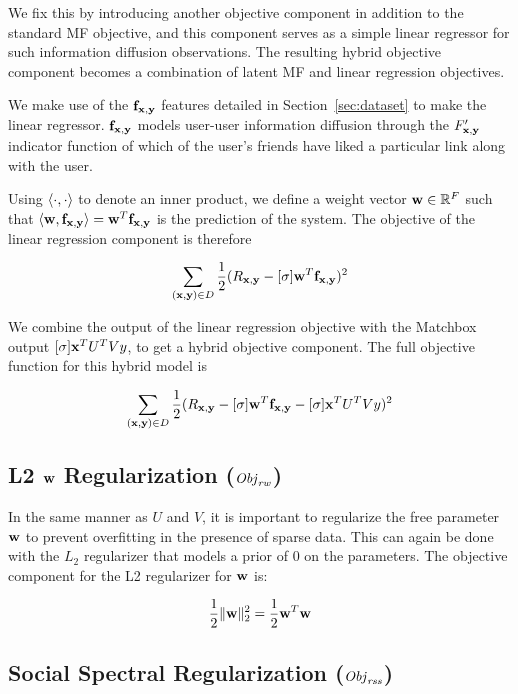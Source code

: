 We fix this by introducing another objective component in addition to the standard MF objective, and this component serves as a simple linear regressor for such information diffusion observations. The resulting hybrid objective component becomes a combination of latent MF and linear regression objectives.

We make use of the $\mathbf{f}_{\mathbf{x},\mathbf{y}}$ features detailed in Section~\ref{sec:dataset} to make the linear regressor. $\mathbf{f}_{\mathbf{x},\mathbf{y}}$ models user-user information diffusion through the $F'_{\mathbf{x},\mathbf{y}}$ indicator function of which of the user's friends have liked a particular link along with the user.

Using $\langle \cdot,\cdot \rangle$ to denote an inner product, we define a weight
vector $\mathbf{w} \in \mathbb{R}^F$ such that $\langle \mathbf{w}, \mathbf{f}_{\mathbf{x},\mathbf{y}} \rangle = \mathbf{w}^T \mathbf{f}_{\mathbf{x},\mathbf{y}}$ is the prediction of the system. The objective of the linear regression component is therefore

\begin{align*}
\sum_{(\mathbf{x},\mathbf{y}) \in D} \frac{1}{2} (R_{\mathbf{x},\mathbf{y}} - [\sigma] \mathbf{w}^T \mathbf{f}_{\mathbf{x},\mathbf{y}})^2
\end{align*}

We combine the output of the linear regression objective with the Matchbox output $[\sigma] \mathbf{x}^T U^T V y$, to get a hybrid objective component. The full objective function for this hybrid model is

\begin{align}
\sum_{(\mathbf{x},\mathbf{y}) \in D} \frac{1}{2} (R_{\mathbf{x},\mathbf{y}} - [\sigma] \mathbf{w}^T \mathbf{f}_{\mathbf{x},\mathbf{y}} - [\sigma] \mathbf{x}^T U^T V y)^2
\end{align}

\subsection{L2 $\mathbf{w}$ Regularization ($ \mathit{Obj}_{\mathit{rw}}$)}

In the same manner as $U$ and $V$, it is important to regularize the free parameter $\mathbf{w}$ to prevent overfitting in
the presence of sparse data. This can again be done with the
$L_2$ regularizer that models a prior of $0$ on the parameters. The objective component for the L2 regularizer for $\mathbf{w}$ is:

\begin{align}
\frac{1}{2} \| \mathbf{w} \|_2^2 = \frac{1}{2} \mathbf{w}^T \mathbf{w}
\end{align}

\subsection{Social Spectral Regularization ($\mathit{Obj}_{\mathit{rss}}$)}


